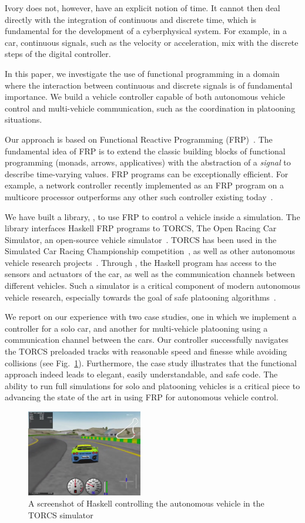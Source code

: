 Ivory does not, however, have an explicit notion of time.
It cannot then deal directly with the integration of 
continuous and discrete time, which is fundamental for the
development of a cyberphysical system. For example,
in a car, continuous signals, such as the velocity or acceleration,
mix with the discrete steps of the digital controller.

In this paper, we investigate the use of functional programming
in a domain where the interaction between continuous and discrete signals
is of fundamental importance. We build a vehicle controller capable
of both autonomous vehicle control and multi-vehicle communication,
such as the coordination in platooning situations.

Our approach is based on Functional Reactive Programming
(FRP)~\cite{hudak2003arrows,hudak2000haskell}.
The fundamental idea of FRP is to extend the classic building blocks 
of functional programming (\eg monads, arrows,
applicatives)
with the abstraction of a \emph{signal} to
describe time-varying values. FRP programs can be exceptionally
efficient.  For example, a network controller recently implemented as
an FRP program on a multicore processor outperforms any other such
controller existing today~\cite{Voellmy:2012:SSD:2377677.2377735}.

We have built a library, \ourLib, to use FRP to control a vehicle inside a simulation.
The library interfaces Haskell FRP programs to TORCS, The Open Racing Car Simulator, an open-source vehicle simulator~\cite{torcs}.
TORCS has been used in the Simulated Car Racing Championship competition~\cite{SCRC}, as well as other autonomous vehicle research projects~\cite{xu2016experimental,OnievaPAMP09,conf/cig/CardamoneLL09,conf/cig/MunozGS10}. 
Through \ourLib, the Haskell program has access to the sensors and actuators of the car, as well
as the communication channels between different vehicles.
Such a simulator is a  critical component of modern autonomous vehicle research, especially towards the goal of safe platooning algorithms~\cite{kamali2016formal}.

We report on our experience with two case studies, one in which we implement a controller for a solo car, and another for multi-vehicle platooning using a communication channel between the cars.
Our controller successfully navigates the TORCS preloaded tracks with reasonable speed and finesse while avoiding collisions (see Fig.~\ref{fig:race}).
Furthermore, the case study illustrates that the functional approach indeed leads to elegant, easily understandable, and safe code.
The ability to run full simulations for solo and platooning vehicles is a critical piece to advancing the state of the art in using FRP for autonomous vehicle control.

\begin{figure}[t]
\includegraphics[width=0.45\textwidth]{figs/racing.png}
\caption{A screenshot of Haskell controlling the autonomous vehicle in the TORCS simulator}
\label{fig:race}
\end{figure}
